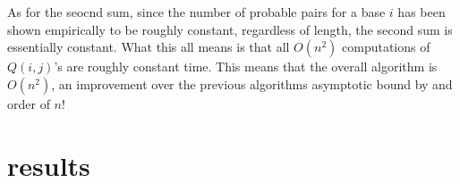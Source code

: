 As for the seocnd sum, since the number of probable pairs for a base
$i$ has been shown empirically to be roughly constant, regardless of
length, the second sum is essentially constant. What this all means is
that all $O(n^2)$ computations of $Q(i,j)$'s are roughly constant
time. This means that the overall algorithm is $O(n^2)$, an
improvement over the previous algorithms asymptotic bound by and order
of $n$!

\section{results}
